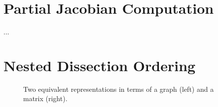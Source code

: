 \documentclass[12pt, oneside]{book}
\begin{document}
\section{Partial Jacobian Computation}
...
\section{Nested Dissection Ordering}
\cite{2014:02}

\begin{figure}[t]
\centering
{}%
\caption{Two equivalent representations in terms of a graph (left) and a matrix (right).}
\label{initial}
\end{figure}
\end{document}
